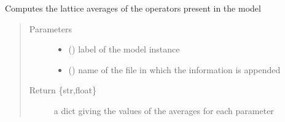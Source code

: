 \documentclass[letterpaper,10pt,english]{sphinxmanual}
\begin{document}

\begin{fulllineitems}
\label{\detokenize{functions:pyqcm.averages}}
\sphinxAtStartPar
Computes the lattice averages of the operators present in the model
\begin{quote}\begin{description}
\item[{Parameters}] \leavevmode\begin{itemize}
\item {} 
\sphinxAtStartPar
{} () \textendash{} label of the model instance

\item {} 
\sphinxAtStartPar
{} () \textendash{} name of the file in which the information is appended

\end{itemize}

\item[{Return \{str,float\}}] \leavevmode
\sphinxAtStartPar
a dict giving the values of the averages for each parameter

\end{description}\end{quote}

\end{fulllineitems}

\end{document}
